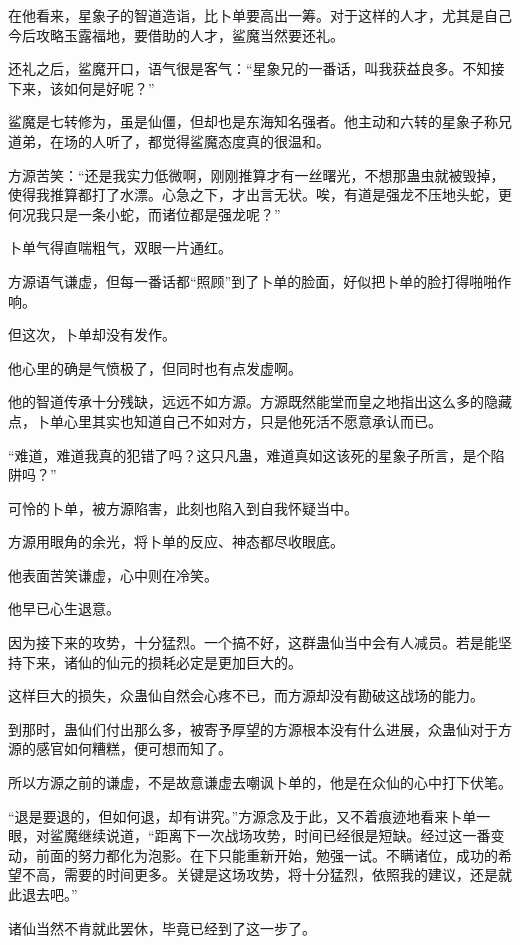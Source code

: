 \begin{this_body}
在他看来，星象子的智道造诣，比卜单要高出一筹。对于这样的人才，尤其是自己今后攻略玉露福地，要借助的人才，鲨魔当然要还礼。

还礼之后，鲨魔开口，语气很是客气：“星象兄的一番话，叫我获益良多。不知接下来，该如何是好呢？”

鲨魔是七转修为，虽是仙僵，但却也是东海知名强者。他主动和六转的星象子称兄道弟，在场的人听了，都觉得鲨魔态度真的很温和。

方源苦笑：“还是我实力低微啊，刚刚推算才有一丝曙光，不想那蛊虫就被毁掉，使得我推算都打了水漂。心急之下，才出言无状。唉，有道是强龙不压地头蛇，更何况我只是一条小蛇，而诸位都是强龙呢？”

卜单气得直喘粗气，双眼一片通红。

方源语气谦虚，但每一番话都“照顾”到了卜单的脸面，好似把卜单的脸打得啪啪作响。

但这次，卜单却没有发作。

他心里的确是气愤极了，但同时也有点发虚啊。

他的智道传承十分残缺，远远不如方源。方源既然能堂而皇之地指出这么多的隐藏点，卜单心里其实也知道自己不如对方，只是他死活不愿意承认而已。

“难道，难道我真的犯错了吗？这只凡蛊，难道真如这该死的星象子所言，是个陷阱吗？”

可怜的卜单，被方源陷害，此刻也陷入到自我怀疑当中。

方源用眼角的余光，将卜单的反应、神态都尽收眼底。

他表面苦笑谦虚，心中则在冷笑。

他早已心生退意。

因为接下来的攻势，十分猛烈。一个搞不好，这群蛊仙当中会有人减员。若是能坚持下来，诸仙的仙元的损耗必定是更加巨大的。

这样巨大的损失，众蛊仙自然会心疼不已，而方源却没有勘破这战场的能力。

到那时，蛊仙们付出那么多，被寄予厚望的方源根本没有什么进展，众蛊仙对于方源的感官如何糟糕，便可想而知了。

所以方源之前的谦虚，不是故意谦虚去嘲讽卜单的，他是在众仙的心中打下伏笔。

“退是要退的，但如何退，却有讲究。”方源念及于此，又不着痕迹地看来卜单一眼，对鲨魔继续说道，“距离下一次战场攻势，时间已经很是短缺。经过这一番变动，前面的努力都化为泡影。在下只能重新开始，勉强一试。不瞒诸位，成功的希望不高，需要的时间更多。关键是这场攻势，将十分猛烈，依照我的建议，还是就此退去吧。”

诸仙当然不肯就此罢休，毕竟已经到了这一步了。


\end{this_body}
